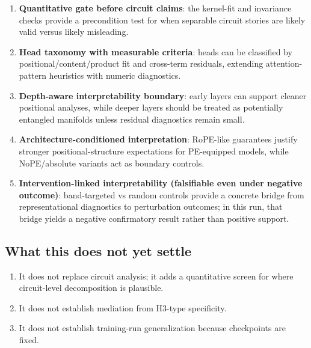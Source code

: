 \documentclass[11pt]{article}
\begin{document}
\begin{enumerate}[leftmargin=*]
  \item \textbf{Quantitative gate before circuit claims}: the kernel-fit and invariance checks provide a precondition test for when separable circuit stories are likely valid versus likely misleading.
  \item \textbf{Head taxonomy with measurable criteria}: heads can be classified by positional/content/product fit and cross-term residuals, extending attention-pattern heuristics with numeric diagnostics.
  \item \textbf{Depth-aware interpretability boundary}: early layers can support cleaner positional analyses, while deeper layers should be treated as potentially entangled manifolds unless residual diagnostics remain small.
  \item \textbf{Architecture-conditioned interpretation}: RoPE-like guarantees justify stronger positional-structure expectations for PE-equipped models, while NoPE/absolute variants act as boundary controls.
  \item \textbf{Intervention-linked interpretability (falsifiable even under negative outcome)}: band-targeted vs random controls provide a concrete bridge from representational diagnostics to perturbation outcomes; in this run, that bridge yields a negative confirmatory result rather than positive support.
\end{enumerate}

\subsection*{What this does not yet settle}
\begin{enumerate}[leftmargin=*]
  \item It does not replace circuit analysis; it adds a quantitative screen for where circuit-level decomposition is plausible.
  \item It does not establish mediation from H3-type specificity.
  \item It does not establish training-run generalization because checkpoints are fixed.
\end{enumerate}
\end{document}
